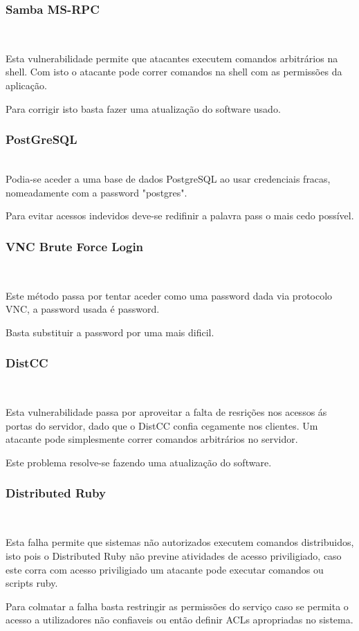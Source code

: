 \subsubsection{Samba MS-RPC}
\hfill\\
\par Esta vulnerabilidade permite que atacantes executem comandos arbitrários na shell. Com isto o atacante pode correr comandos na shell com as permissões da aplicação.
\par Para corrigir isto basta fazer uma atualização do software usado.

\subsubsection{PostGreSQL}
\hfill\\
Podia-se aceder a uma base de dados PostgreSQL ao usar credenciais fracas, nomeadamente com a password "postgres".
\par Para evitar acessos indevidos deve-se redifinir a palavra pass o mais cedo possível. 


\subsubsection{VNC Brute Force Login}
\hfill\\
\par Este método passa por tentar aceder como uma password dada via protocolo VNC, a password usada é password.
\par Basta substituir a password por uma mais dificil.


\subsubsection{DistCC}
\hfill\\
\par Esta vulnerabilidade passa por aproveitar a falta de resrições nos acessos ás portas do servidor, dado que o DistCC confia cegamente nos clientes. Um atacante pode simplesmente correr comandos arbitrários no servidor.
\par Este problema resolve-se fazendo uma atualização do software.


\subsubsection{Distributed Ruby}
\hfill\\
\par Esta falha permite que sistemas não autorizados executem comandos distribuidos, isto pois o Distributed Ruby não previne atividades de acesso priviligiado, caso este corra com acesso priviligiado um atacante pode executar comandos ou scripts ruby.
\par Para colmatar a falha basta restringir as permissões do serviço caso se permita o acesso a utilizadores não confiaveis ou então definir ACLs apropriadas no sistema.


